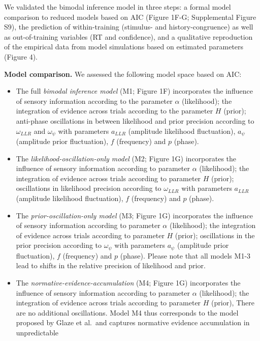 \documentclass[
]{article}
\begin{document}
We validated the bimodal inference model in three steps: a formal model
comparison to reduced models based on AIC (Figure 1F-G; Supplemental
Figure S9), the prediction of within-training (stimulus- and
history-congruence) as well as out-of-training variables (RT and
confidence), and a qualitative reproduction of the empirical data from
model simulations based on estimated parameters (Figure 4).

\textbf{Model comparison.} We assessed the following model space based
on AIC:

\begin{itemize}
\item
  The full \emph{bimodal inference model} (M1; Figure 1F) incorporates
  the influence of sensory information according to the parameter
  \(\alpha\) (likelihood); the integration of evidence across trials
  according to the parameter \(H\) (prior); anti-phase oscillations in
  between likelihood and prior precision according to \(\omega_{LLR}\)
  and \(\omega_{\psi}\) with parameters \(a_{LLR}\) (amplitude
  likelihood fluctuation), \(a_{\psi}\) (amplitude prior fluctuation),
  \(f\) (frequency) and \(p\) (phase).
\item
  The \emph{likelihood-oscillation-only model} (M2; Figure 1G)
  incorporates the influence of sensory information according to
  parameter \(\alpha\) (likelihood); the integration of evidence across
  trials according to parameter \(H\) (prior); oscillations in
  likelihood precision according to \(\omega_{LLR}\) with parameters
  \(a_{LLR}\) (amplitude likelihood fluctuation), \(f\) (frequency) and
  \(p\) (phase).
\item
  The \emph{prior-oscillation-only model} (M3; Figure 1G) incorporates
  the influence of sensory information according to parameter \(\alpha\)
  (likelihood); the integration of evidence across trials according to
  parameter \(H\) (prior); oscillations in the prior precision according
  to \(\omega_{\psi}\) with parameters \(a_{\psi}\) (amplitude prior
  fluctuation), \(f\) (frequency) and \(p\) (phase). Please note that
  all models M1-3 lead to shifts in the relative precision of likelihood
  and prior.
\item
  The \emph{normative-evidence-accumulation} (M4; Figure 1G)
  incorporates the influence of sensory information according to
  parameter \(\alpha\) (likelihood); the integration of evidence across
  trials according to parameter \(H\) (prior), There are no additional
  oscillations. Model M4 thus corresponds to the model proposed by Glaze
  et al.~and captures normative evidence accumulation in unpredictable

\end{itemize}
\end{document}
